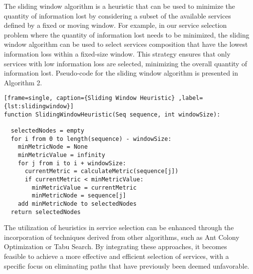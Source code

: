 The sliding window algorithm is a heuristic that can be used to minimize the quantity of information lost by considering a subset of the available services defined by a fixed or moving window.
For example, in our service selection problem where the quantity of information lost needs to be minimized, the sliding window algorithm can be used to select services composition that have the lowest information loss within a fixed-size window.
This strategy ensures that only services with low information loss are selected, minimizing the overall quantity of information lost.
Pseudo-code for the sliding window algorithm is presented in Algorithm 2.
\begin{lstlisting}[frame=single, caption={Sliding Window Heuristic} ,label={lst:slidingwindow}]
function SlidingWindowHeuristic(Seq sequence, int windowSize):

  selectedNodes = empty
  for i from 0 to length(sequence) - windowSize:
    minMetricNode = None
    minMetricValue = infinity
    for j from i to i + windowSize:
      currentMetric = calculateMetric(sequence[j])
      if currentMetric < minMetricValue:
        minMetricValue = currentMetric
        minMetricNode = sequence[j]
    add minMetricNode to selectedNodes
  return selectedNodes
\end{lstlisting}
The utilization of heuristics in service selection can be enhanced through the incorporation of techniques derived from other algorithms, such as Ant Colony Optimization or Tabu Search.
By integrating these approaches, it becomes feasible to achieve a more effective and efficient selection of services, with a specific focus on eliminating paths that have previously been deemed unfavorable.

